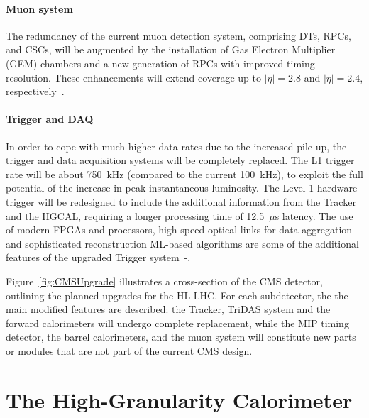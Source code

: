 \paragraph{Muon system}
The redundancy of the current muon detection system, comprising DTs, RPCs, and CSCs, will be augmented by the installation of Gas Electron Multiplier (GEM) chambers and a new generation of RPCs with improved timing resolution. These enhancements will extend coverage up to $|\eta|=2.8$ and $|\eta|=2.4$, respectively~\cite{CERN-LHCC-2017-012}.

\paragraph{Trigger and DAQ}
In order to cope with much higher data rates due to the increased pile-up, the trigger and data acquisition systems will be completely replaced. The L1 trigger rate will be about 750~kHz (compared to the current 100~kHz), to exploit the full potential of the increase in peak instantaneous luminosity.
The Level-1 hardware trigger will be redesigned to include the additional information from the Tracker and the HGCAL, requiring a longer processing time of 12.5~$\mu$s latency. 
The use of modern FPGAs and processors, high-speed optical links for data aggregation and sophisticated reconstruction ML-based algorithms are some of the additional features of the upgraded Trigger system~\cite{CERN-LHCC-2017-013}-\cite{CERN-LHCC-2017-014}.

\bigbreak

Figure~\ref{fig:CMSUpgrade} illustrates a cross-section of the CMS detector, outlining the planned upgrades for the HL-LHC. For each subdetector, the the main modified features are described: the Tracker, TriDAS system and the forward calorimeters will undergo complete replacement, while the MIP timing detector, the barrel calorimeters, and the muon system will constitute new parts or modules that are not part of the current CMS design.


\section{The High-Granularity Calorimeter}
\label{sec:The High-Granularity Calorimeter}


